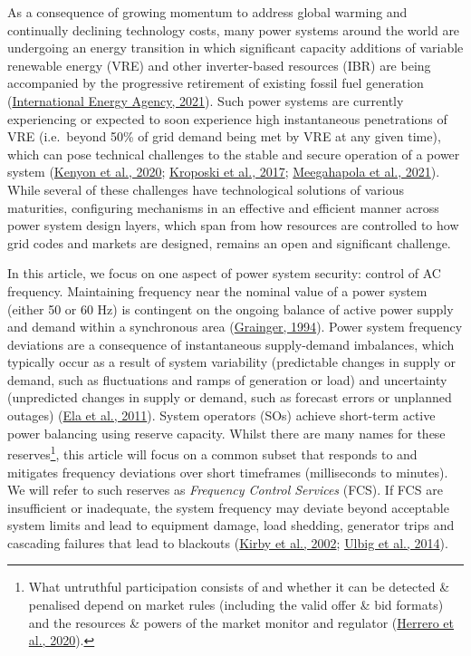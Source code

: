\documentclass[12pt,a4paper,]{report}
\begin{document}
As a consequence of growing momentum to address global warming and
continually declining technology costs, many power systems around the
world are undergoing an energy transition in which significant capacity
additions of variable renewable energy (VRE) and other inverter-based
resources (IBR) are being accompanied by the progressive retirement of
existing fossil fuel generation
(\protect\hyperlink{ref-internationalenergyagencyNetZero20502021}{International
Energy Agency, 2021}). Such power systems are currently experiencing or
expected to soon experience high instantaneous penetrations of VRE
(i.e.~beyond 50\% of grid demand being met by VRE at any given time),
which can pose technical challenges to the stable and secure operation
of a power system
(\protect\hyperlink{ref-kenyonStabilityControlPower2020}{Kenyon et al.,
2020};
\protect\hyperlink{ref-kroposkiAchieving100Renewable2017}{Kroposki et
al., 2017};
\protect\hyperlink{ref-meegahapolaPowerSystemStability2021}{Meegahapola
et al., 2021}). While several of these challenges have technological
solutions of various maturities, configuring mechanisms in an effective
and efficient manner across power system design layers, which span from
how resources are controlled to how grid codes and markets are designed,
remains an open and significant challenge.

In this article, we focus on one aspect of power system security:
control of AC frequency. Maintaining frequency near the nominal value of
a power system (either 50 or 60 Hz) is contingent on the ongoing balance
of active power supply and demand within a synchronous area
(\protect\hyperlink{ref-graingerPowerSystemAnalysis1994}{Grainger,
1994}). Power system frequency deviations are a consequence of
instantaneous supply-demand imbalances, which typically occur as a
result of system variability (predictable changes in supply or demand,
such as fluctuations and ramps of generation or load) and uncertainty
(unpredicted changes in supply or demand, such as forecast errors or
unplanned outages)
(\protect\hyperlink{ref-elaOperatingReservesVariable2011}{Ela et al.,
2011}). System operators (SOs) achieve short-term active power balancing
using reserve capacity. Whilst there are many names for these
reserves\footnote{What untruthful participation consists of and whether
  it can be detected \& penalised depend on market rules (including the
  valid offer \& bid formats) and the resources \& powers of the market
  monitor and regulator
  (\protect\hyperlink{ref-herreroEvolvingBiddingFormats2020}{Herrero et
  al., 2020}).}, this article will focus on a common subset that
responds to and mitigates frequency deviations over short timeframes
(milliseconds to minutes). We will refer to such reserves as
\emph{Frequency Control Services} (FCS). If FCS are insufficient or
inadequate, the system frequency may deviate beyond acceptable system
limits and lead to equipment damage, load shedding, generator trips and
cascading failures that lead to blackouts
(\protect\hyperlink{ref-kirbyFrequencyControlConcerns2002}{Kirby et al.,
2002}; \protect\hyperlink{ref-ulbigImpactLowRotational2014}{Ulbig et
al., 2014}).
\end{document}
